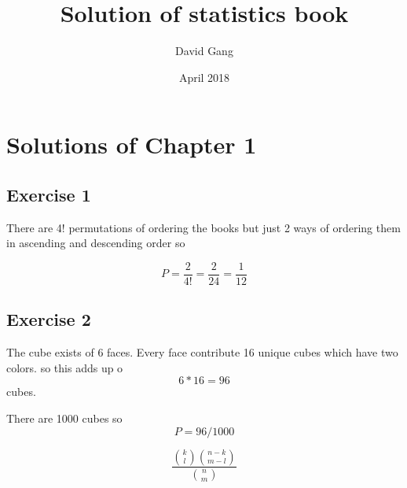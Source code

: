 \documentclass{book}
\title{Solution of statistics book}
\author{David Gang}
\date{April 2018}
\begin{document}
   \maketitle

\chapter{Solutions of Chapter 1}
\section*{Exercise 1}
There are 4! permutations of ordering the books but just 2 ways of ordering them in ascending and descending order so 


\[P = \frac{2}{4!} = \frac{2}{24} = \frac{1}{12} \]

\section*{Exercise 2}
The cube exists of 6 faces. Every face contribute 16 unique cubes which have two colors. so this adds up o \[6*16 = 96\] cubes.

There are 1000 cubes so \[P = 96/1000\]

\[\frac{\binom{k}{l}  \binom{n-k}{m-l}}{\binom{n}{m}} \] 
\end{document}
